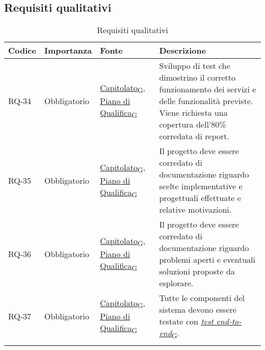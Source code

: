 \subsection{Requisiti qualitativi}
\begin{longtable}{|>{\centering\arraybackslash}m{}|>{\centering\arraybackslash}m{}|>{\centering\arraybackslash}m{}|>{\centering\arraybackslash}m{}|}
	\hline
	\textbf{Codice} & \textbf{Importanza} & \textbf{Fonte}                                                                                                                                                                                                                                       & \textbf{Descrizione}                                                                                                                                                                            \\\hline
	\endfirsthead
	RQ-34           & Obbligatorio        & \href{https://7last.github.io/docs/rtb/documentazione-interna/glossario\#capitolato}{Capitolato\textsubscript{G}}, \href{https://7last.github.io/docs/rtb/documentazione-interna/glossario\#piano-di-qualifica}{Piano di Qualifica\textsubscript{G}} & Sviluppo di test che dimostrino il corretto funzionamento dei servizi e delle funzionalità previste. Viene richiesta una copertura dell'80\% corredata di report.                               \\\hline
	RQ-35           & Obbligatorio        & \href{https://7last.github.io/docs/rtb/documentazione-interna/glossario\#capitolato}{Capitolato\textsubscript{G}}, \href{https://7last.github.io/docs/rtb/documentazione-interna/glossario\#piano-di-qualifica}{Piano di Qualifica\textsubscript{G}} & Il progetto deve essere corredato di documentazione riguardo scelte implementative e progettuali effettuate e relative motivazioni.                                                             \\\hline
	RQ-36           & Obbligatorio        & \href{https://7last.github.io/docs/rtb/documentazione-interna/glossario\#capitolato}{Capitolato\textsubscript{G}}, \href{https://7last.github.io/docs/rtb/documentazione-interna/glossario\#piano-di-qualifica}{Piano di Qualifica\textsubscript{G}} & Il progetto deve essere corredato di documentazione riguardo problemi aperti e eventuali soluzioni proposte da esplorare.                                                                       \\\hline
	RQ-37           & Obbligatorio        & \href{https://7last.github.io/docs/rtb/documentazione-interna/glossario\#capitolato}{Capitolato\textsubscript{G}}, \href{https://7last.github.io/docs/rtb/documentazione-interna/glossario\#piano-di-qualifica}{Piano di Qualifica\textsubscript{G}} & Tutte le componenti del sistema devono essere testate con \href{https://7last.github.io/docs/rtb/documentazione-interna/glossario\#test-end-to-end}{\textit{test end-to-end}\textsubscript{G}}. \\\hline
	\caption{Requisiti qualitativi}
	\label{table:2}
\end{longtable}

